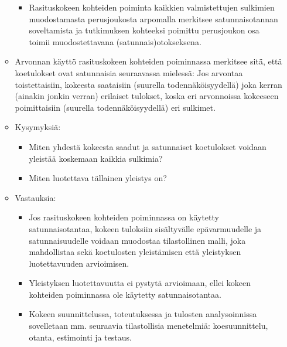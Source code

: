 \documentclass[
]{book}
\providecommand{\tightlist}{%
  \setlength{\itemsep}{0pt}\setlength{\parskip}{0pt}}
\begin{document}
\begin{eblock}{}
\begin{itemize}
\begin{itemize}
    \begin{itemize}
    \tightlist
    \item
      Rasituskokeen kohteiden poiminta kaikkien valmistettujen sulkimien muodostamasta perusjoukosta arpomalla merkitsee satunnaisotannan soveltamista ja tutkimuksen kohteeksi poimittu perusjoukon osa toimii muodostettavana (satunnais)otokseksena.\\
    \end{itemize}
  \item
    Arvonnan käyttö rasituskokeen kohteiden poiminnassa merkitsee sitä, että koetulokset ovat satunnaisia seuraavassa mielessä: Jos arvontaa toistettaisiin, kokeesta saataisiin (suurella todennäköisyydellä) joka kerran (ainakin jonkin verran) erilaiset tulokset, koska eri arvonnoissa kokeeseen poimittaisiin (suurella todennäköisyydellä) eri sulkimet.\\
  \item
    Kysymyksiä:

    \begin{itemize}
    \tightlist
    \item
      Miten yhdestä kokeesta saadut ja satunnaiset koetulokset voidaan yleistää koskemaan kaikkia sulkimia?\\
    \item
      Miten luotettava tällainen yleistys on?\\
    \end{itemize}
  \item
    Vastauksia:

    \begin{itemize}
    \tightlist
    \item
      Jos rasituskokeen kohteiden poiminnassa on käytetty satunnaisotantaa, kokeen tuloksiin sisältyvälle epävarmuudelle ja satunnaisuudelle voidaan muodostaa tilastollinen malli, joka mahdollistaa sekä koetulosten yleistämisen että yleistyksen luotettavuuden arvioimisen.\\
    \item
      Yleistyksen luotettavuutta ei pystytä arvioimaan, ellei kokeen kohteiden poiminnassa ole käytetty satunnaisotantaa.\\
    \item
      Kokeen suunnittelussa, toteutuksessa ja tulosten analysoinnissa sovelletaan mm. seuraavia tilastollisia menetelmiä: koesuunnittelu, otanta, estimointi ja testaus.\\
    \end{itemize}
  \end{itemize}
\end{itemize}

\end{eblock}
\end{document}
